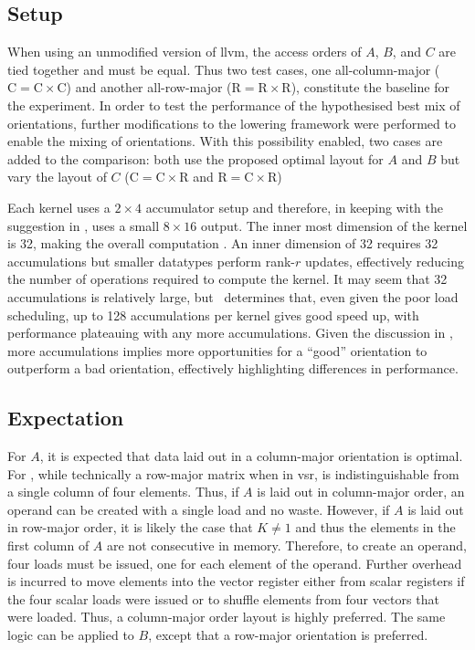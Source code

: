 \documentclass[\main/thesis.tex]{subfiles}
\begin{document}
\subsection{Setup}
When using an unmodified version of \gls{llvm}, the access orders of $A$, $B$, and $C$ are tied together and must be equal.
Thus two test cases, one all-column-major ($\textrm{C} = \textrm{C} \times \textrm{C}$) and another all-row-major ($\textrm{R} = \textrm{R} \times \textrm{R}$), constitute the baseline for the experiment.
In order to test the performance of the hypothesised best mix of orientations, further modifications to the lowering framework were performed to enable the mixing of orientations.
With this possibility enabled, two cases are added to the comparison: both use the proposed optimal layout for $A$ and $B$ but vary the layout of $C$ ($\textrm{C} = \textrm{C} \times \textrm{R}$ and $\textrm{R} = \textrm{C} \times \textrm{R}$)

Each kernel uses a $2 \times 4$ accumulator setup and therefore, in keeping with the suggestion in , uses a small $8 \times 16$ output.
The inner most dimension of the kernel is 32, making the overall computation .
An inner dimension of 32 requires 32 accumulations but smaller datatypes perform rank-$r$ updates, effectively reducing the number of operations required to compute the kernel.
It may seem that 32 accumulations is relatively large, but~\autocite{kuzma2021fast} determines that, even given the poor load scheduling, up to 128 accumulations per kernel gives good speed up, with performance plateauing with any more accumulations.
Given the discussion in , more accumulations implies more opportunities for a ``good'' orientation to outperform a bad orientation, effectively highlighting differences in performance.

\subsection{Expectation}
\label{sec:orderExpectation}
For $A$, it is expected that data laid out in a column-major orientation is optimal.
For , while technically a row-major matrix when in \gls{vsr}, is indistinguishable from a single column of four elements.
Thus, if $A$ is laid out in column-major order, an operand can be created with a single load and no waste.
However, if $A$ is laid out in row-major order, it is likely the case that $K \ne 1$ and thus the elements in the first column of $A$ are not consecutive in memory.
Therefore, to create an operand, four loads must be issued, one for each element of the operand.
Further overhead is incurred to move elements into the vector register either from scalar registers if the four scalar loads were issued or to shuffle elements from four vectors that were loaded.
Thus, a column-major order layout is highly preferred.
The same logic can be applied to $B$, except that a row-major orientation is preferred.
\end{document}
